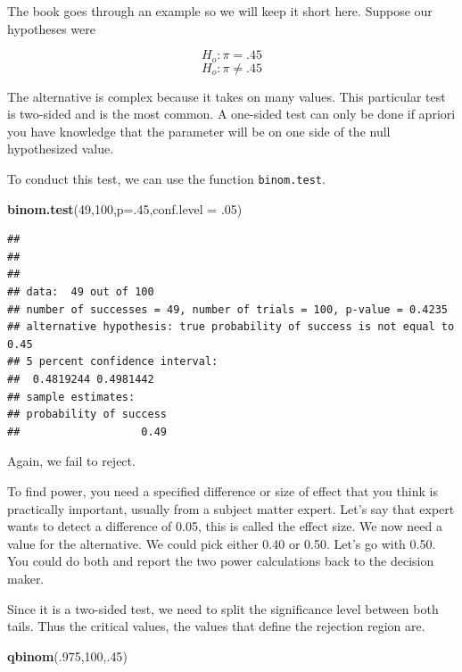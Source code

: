 \documentclass[]{book}
\newenvironment{Shaded}{\begin{snugshade}}{\end{snugshade}}
\newcommand{\KeywordTok}[1]{\textcolor[rgb]{0.13,0.29,0.53}{\textbf{#1}}}
\newcommand{\DataTypeTok}[1]{\textcolor[rgb]{0.13,0.29,0.53}{#1}}
\newcommand{\DecValTok}[1]{\textcolor[rgb]{0.00,0.00,0.81}{#1}}
\newcommand{\NormalTok}[1]{#1}
\theoremstyle{definition}
\theoremstyle{definition}
\theoremstyle{definition}
\theoremstyle{remark}
\begin{document}
The book goes through an example so we will keep it short here. Suppose
our hypotheses were

\[H_{o}:\pi=.45\] \[H_{o}:\pi\neq.45\]

The alternative is complex because it takes on many values. This
particular test is two-sided and is the most common. A one-sided test
can only be done if apriori you have knowledge that the parameter will
be on one side of the null hypothesized value.

To conduct this test, we can use the function \texttt{binom.test}.

\begin{Shaded}
\begin{Highlighting}[]
\KeywordTok{binom.test}\NormalTok{(}\DecValTok{49}\NormalTok{,}\DecValTok{100}\NormalTok{,}\DataTypeTok{p=}\NormalTok{.}\DecValTok{45}\NormalTok{,}\DataTypeTok{conf.level =}\NormalTok{ .}\DecValTok{05}\NormalTok{)}
\end{Highlighting}
\end{Shaded}

\begin{verbatim}
## 
## 
## 
## data:  49 out of 100
## number of successes = 49, number of trials = 100, p-value = 0.4235
## alternative hypothesis: true probability of success is not equal to 0.45
## 5 percent confidence interval:
##  0.4819244 0.4981442
## sample estimates:
## probability of success 
##                   0.49
\end{verbatim}

Again, we fail to reject.

To find power, you need a specified difference or size of effect that
you think is practically important, usually from a subject matter
expert. Let's say that expert wants to detect a difference of 0.05, this
is called the effect size. We now need a value for the alternative. We
could pick either 0.40 or 0.50. Let's go with 0.50. You could do both
and report the two power calculations back to the decision maker.

Since it is a two-sided test, we need to split the significance level
between both tails. Thus the critical values, the values that define the
rejection region are.

\begin{Shaded}
\begin{Highlighting}[]
\KeywordTok{qbinom}\NormalTok{(.}\DecValTok{975}\NormalTok{,}\DecValTok{100}\NormalTok{,.}\DecValTok{45}\NormalTok{)}
\end{Highlighting}
\end{Shaded}
\end{document}
